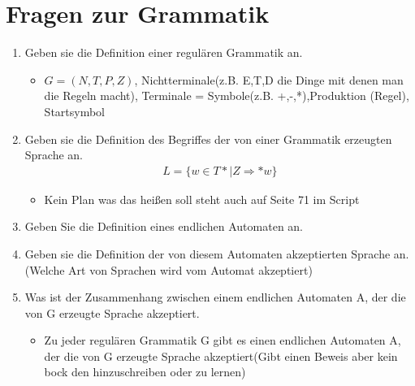 \section{Fragen zur Grammatik}
\begin{enumerate}
  \item Geben sie die Definition einer regulären Grammatik an.
  \begin{itemize}
    \item [] $G=(N,T,P,Z)$, Nichtterminale(z.B. E,T,D die Dinge mit denen man die Regeln macht), Terminale = Symbole(z.B. +,-,*),Produktion (Regel), Startsymbol
  \end{itemize}
  \item Geben sie die Definition des Begriffes der von einer Grammatik erzeugten Sprache an.
  \begin{align*}
    L=\{w\in T* | Z \Longrightarrow*w\}
  \end{align*}
  \begin{itemize}
    \item Kein Plan was das heißen soll steht auch auf Seite 71 im Script
  \end{itemize}
  \item Geben Sie die Definition eines endlichen Automaten an.
  \item Geben sie die Definition der von diesem Automaten akzeptierten Sprache an.(Welche Art von Sprachen wird vom Automat akzeptiert)
  \item Was ist der Zusammenhang zwischen einem endlichen Automaten A, der die von G erzeugte Sprache akzeptiert.
  \begin{itemize}
    \item Zu jeder regulären Grammatik G gibt es einen endlichen Automaten A, der die von G erzeugte Sprache akzeptiert(Gibt einen Beweis aber kein bock den hinzuschreiben oder zu lernen)


\end{itemize}
\end{enumerate}

